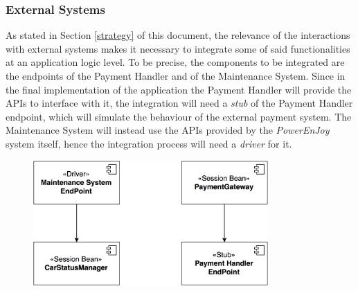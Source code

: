 \subsubsection{External Systems}
As stated in Section \ref{strategy} of this document, the relevance of the interactions with external systems makes it necessary to integrate some of said functionalities at an application logic level.
\noindent
To be precise, the components to be integrated are the endpoints of the Payment Handler and of the Maintenance System. Since in the final implementation of the application the Payment Handler will provide the APIs to interface with it, the integration will need a \emph{stub} of the Payment Handler endpoint, which will simulate the behaviour of the external payment system. The Maintenance System will instead use the APIs provided by the \textit{PowerEnJoy} system itself, hence the integration process will need a \emph{driver} for it.

\begin{figure}[H]
\begin{center}
		\includegraphics[width=0.8\textwidth]{./integration_strategy/diagrams/external_systems.png}
\end{center}
\end{figure}

